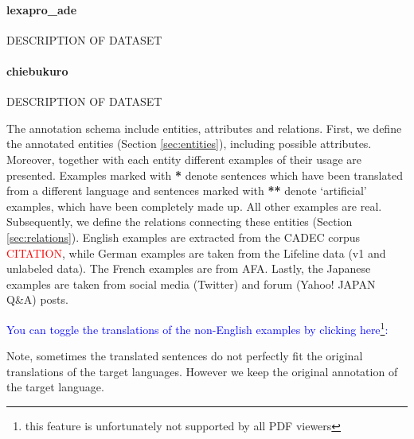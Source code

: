\documentclass[12pt]{article}
\theoremstyle{definition}
\begin{document}
\paragraph{lexapro\_ade} DESCRIPTION OF DATASET 
\paragraph{chiebukuro} DESCRIPTION OF DATASET 

\noindent The annotation schema include entities, attributes and relations. First, we define the annotated entities (Section \ref{sec:entities}), including possible attributes. Moreover, together with each entity different examples of their usage are presented. Examples marked with \textbf{*} denote sentences which have been translated from a different language and sentences marked with \textbf{**} denote `artificial' examples, which have been completely made up. All other examples are real.
Subsequently, we define the relations connecting these entities (Section \ref{sec:relations}).
English examples are extracted from the CADEC corpus \textcolor{red}{CITATION}, while German examples are taken from the Lifeline data (v1 and unlabeled data).
The French examples are from AFA.
Lastly, the Japanese examples are taken from social media (Twitter) and forum (Yahoo! JAPAN Q\&A) posts.


\textcolor{blue}{You can toggle the translations of the non-English examples by clicking here\footnote{this feature is  unfortunately not supported by all PDF viewers}:}

\begin{center}
\begin{tcolorbox}[hbox]
\end{tcolorbox}
\end{center}

\noindent Note, sometimes the translated sentences do not perfectly fit the original translations of the target languages. However we keep the original annotation of the target language.
\end{document}
